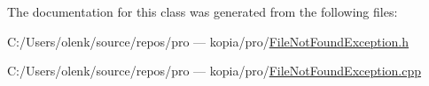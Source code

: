 The documentation for this class was generated from the following files\+:\begin{DoxyCompactItemize}
\item 
C\+:/\+Users/olenk/source/repos/pro — kopia/pro/\mbox{\hyperlink{_file_not_found_exception_8h}{File\+Not\+Found\+Exception.\+h}}\item 
C\+:/\+Users/olenk/source/repos/pro — kopia/pro/\mbox{\hyperlink{_file_not_found_exception_8cpp}{File\+Not\+Found\+Exception.\+cpp}}\end{DoxyCompactItemize}
